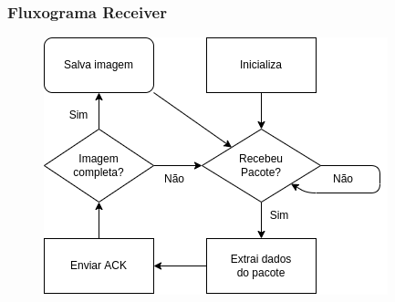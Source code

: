 \documentclass[12pt]{beamer}
\begin{document}
\begin{frame}
    \frametitle{Fluxograma Receiver}
    \begin{figure}[!h]
        \centering
        \includegraphics[width=.7\textwidth]{fluxogram_recivier}
    \end{figure}
\end{frame}
\end{document}
